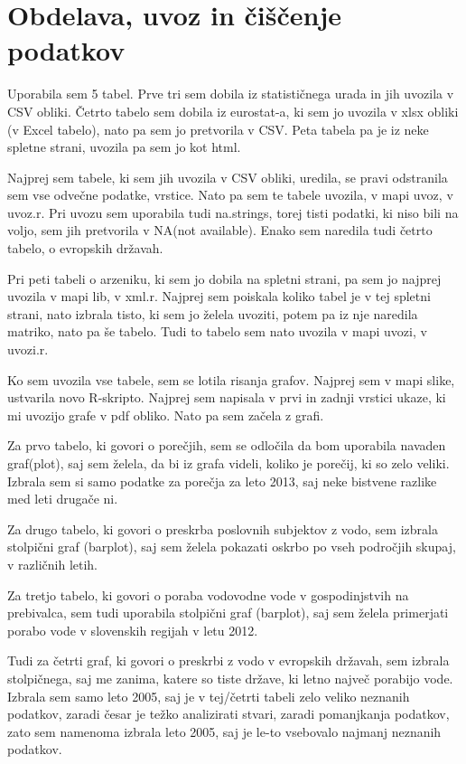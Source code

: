 \documentclass[11pt,a4paper]{article}
\begin{document}
\section{Obdelava, uvoz in čiščenje podatkov}
Uporabila sem 5 tabel.
Prve tri sem dobila iz statističnega urada in jih uvozila v CSV obliki.
Četrto tabelo sem dobila iz eurostat-a, ki sem jo uvozila v xlsx obliki (v Excel tabelo), nato pa sem jo pretvorila v CSV. Peta tabela pa je iz neke spletne strani, uvozila pa sem jo kot html.

Najprej sem tabele, ki sem jih uvozila v CSV obliki, uredila, se pravi odstranila sem vse odvečne podatke, vrstice. Nato pa sem te tabele uvozila, v mapi uvoz, v uvoz.r. Pri uvozu sem uporabila tudi na.strings, torej tisti podatki, ki niso bili na voljo, sem jih pretvorila v NA(not available). Enako sem naredila tudi četrto tabelo, o evropskih državah.

Pri peti tabeli o arzeniku, ki sem jo dobila na spletni strani, pa sem jo najprej uvozila v mapi lib, v xml.r. Najprej sem poiskala koliko tabel je v tej spletni strani, nato izbrala tisto, ki sem jo želela uvoziti, potem pa iz nje naredila matriko, nato pa še tabelo. Tudi to tabelo sem nato uvozila v mapi uvozi, v uvozi.r.

Ko sem uvozila vse tabele, sem se lotila risanja grafov. Najprej sem v mapi slike, ustvarila novo R-skripto. Najprej sem napisala v prvi in zadnji vrstici ukaze, ki mi uvozijo grafe v pdf obliko. Nato pa sem začela z grafi. 

Za prvo tabelo, ki govori o porečjih, sem se odločila da bom uporabila navaden graf(plot), saj sem želela, da bi iz grafa videli, koliko je porečij, ki so zelo veliki. Izbrala sem si samo podatke za porečja za leto 2013, saj neke bistvene razlike med leti drugače ni. 

Za drugo tabelo, ki govori o preskrba poslovnih subjektov z vodo, sem izbrala stolpični graf (barplot), saj sem želela pokazati oskrbo po vseh področjih skupaj, v različnih letih. 

Za tretjo tabelo, ki govori o poraba vodovodne vode v gospodinjstvih na prebivalca, sem tudi uporabila stolpični graf (barplot), saj sem želela primerjati porabo vode v slovenskih regijah v letu 2012. 

Tudi za četrti graf, ki govori o preskrbi z vodo v evropskih državah, sem izbrala stolpičnega, saj me zanima, katere so tiste države, ki letno največ porabijo vode. Izbrala sem samo leto 2005, saj je v tej/četrti tabeli zelo veliko neznanih podatkov, zaradi česar je težko analizirati stvari, zaradi pomanjkanja podatkov, zato sem namenoma izbrala leto 2005, saj je le-to vsebovalo najmanj neznanih podatkov.
\end{document}
